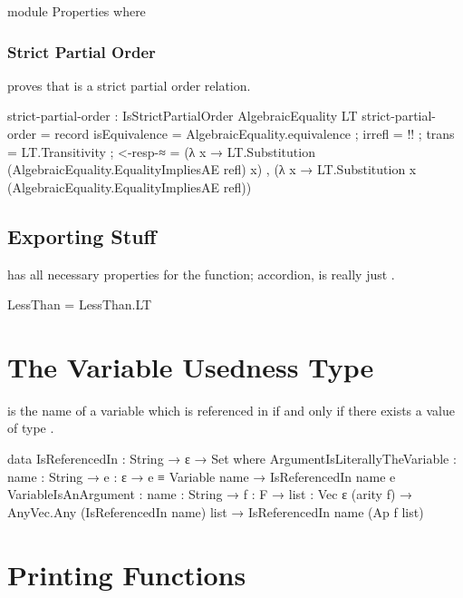 \documentclass{report}
\begin{document}
\begin{code}
    module Properties where
\end{code}

\subsection{Strict Partial Order}
 proves that  is a strict partial order relation.

\begin{code}
      strict-partial-order : IsStrictPartialOrder AlgebraicEquality LT
      strict-partial-order = record
        { isEquivalence = AlgebraicEquality.equivalence
        ; irrefl = {!!}
        ; trans = LT.Transitivity
        ; <-resp-≈ = (λ x → LT.Substitution (AlgebraicEquality.EqualityImpliesAE refl) x)
                   , (λ x → LT.Substitution x (AlgebraicEquality.EqualityImpliesAE refl))
        }
\end{code}

\section{Exporting Stuff}
 has all necessary properties for the  function; accordion,  is really just .

\begin{code}
  LessThan = LessThan.LT
\end{code}

\chapter{The Variable Usedness Type}
 is the name of a variable which is referenced in  if and only if there exists a value of type   .

\begin{code}
  data IsReferencedIn : String → ε → Set where
    ArgumentIsLiterallyTheVariable :
      {name : String} →
      {e : ε} →
      e ≡ Variable name →
      IsReferencedIn name e
    VariableIsAnArgument :
      {name : String} →
      {f : F} →
      {list : Vec ε (arity f)} →
      AnyVec.Any (IsReferencedIn name) list →
      IsReferencedIn name (Ap f list)
\end{code}

\chapter{Printing Functions}
\end{document}
